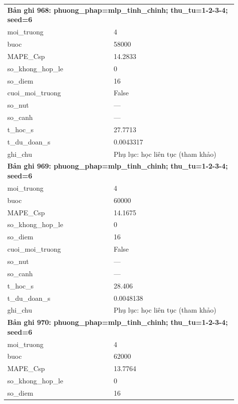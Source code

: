 \begin{longtable}{p{0.43\linewidth}p{0.50\linewidth}}
\midrule
\multicolumn{2}{p{0.95\linewidth}}{\textbf{Bản ghi 968: phuong\_phap=mlp\_tinh\_chinh; thu\_tu=1-2-3-4; seed=6}} \\
moi\_\allowbreak truong & 4 \\
buoc & 58000 \\
MAPE\_\allowbreak Csp & 14.2833 \\
so\_\allowbreak khong\_\allowbreak hop\_\allowbreak le & 0 \\
so\_\allowbreak diem & 16 \\
cuoi\_\allowbreak moi\_\allowbreak truong & False \\
so\_\allowbreak nut & — \\
so\_\allowbreak canh & — \\
t\_\allowbreak hoc\_\allowbreak s & 27.7713 \\
t\_\allowbreak du\_\allowbreak doan\_\allowbreak s & 0.0043317 \\
ghi\_\allowbreak chu & Phụ lục: học liên tục (tham khảo) \\
\midrule
\multicolumn{2}{p{0.95\linewidth}}{\textbf{Bản ghi 969: phuong\_phap=mlp\_tinh\_chinh; thu\_tu=1-2-3-4; seed=6}} \\
moi\_\allowbreak truong & 4 \\
buoc & 60000 \\
MAPE\_\allowbreak Csp & 14.1675 \\
so\_\allowbreak khong\_\allowbreak hop\_\allowbreak le & 0 \\
so\_\allowbreak diem & 16 \\
cuoi\_\allowbreak moi\_\allowbreak truong & False \\
so\_\allowbreak nut & — \\
so\_\allowbreak canh & — \\
t\_\allowbreak hoc\_\allowbreak s & 28.406 \\
t\_\allowbreak du\_\allowbreak doan\_\allowbreak s & 0.0048138 \\
ghi\_\allowbreak chu & Phụ lục: học liên tục (tham khảo) \\
\midrule
\multicolumn{2}{p{0.95\linewidth}}{\textbf{Bản ghi 970: phuong\_phap=mlp\_tinh\_chinh; thu\_tu=1-2-3-4; seed=6}} \\
moi\_\allowbreak truong & 4 \\
buoc & 62000 \\
MAPE\_\allowbreak Csp & 13.7764 \\
so\_\allowbreak khong\_\allowbreak hop\_\allowbreak le & 0 \\
so\_\allowbreak diem & 16 \\

\end{longtable}
